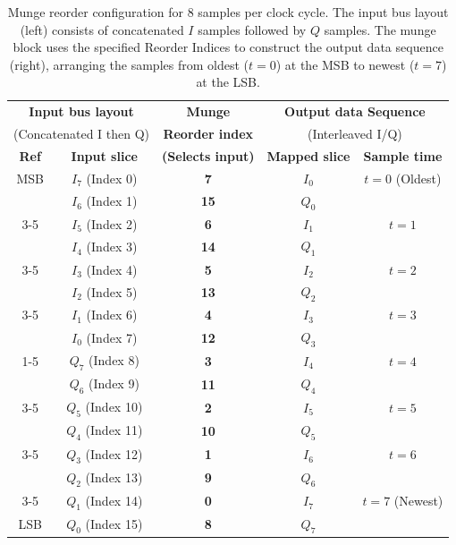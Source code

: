 \begin{table}[t]
\centering
\caption[Munge reorder configuration for 8 samples per clock]{Munge reorder configuration for 8 samples per clock cycle. The input bus layout (left) consists of concatenated $I$ samples followed by $Q$ samples. The munge block uses the specified Reorder Indices to construct the output data sequence (right), arranging the samples from oldest ($t=0$) at the MSB to newest ($t=7$) at the LSB.}
\label{tab:munge_reorder}
\renewcommand{\arraystretch}{1.2}
\setlength{\tabcolsep}{12pt}
\begin{tabular}{c c | c | c c}
\toprule
\multicolumn{2}{c|}{\textbf{Input bus layout}} & \textbf{Munge} & \multicolumn{2}{c}{\textbf{Output data Sequence}} \\
\multicolumn{2}{c|}{(Concatenated I then Q)} & \textbf{Reorder index} & \multicolumn{2}{c}{(Interleaved I/Q)} \\
\textbf{Ref} & \textbf{Input slice} & \textbf{(Selects input)} & \textbf{Mapped slice} & \textbf{Sample time} \\
\midrule
MSB & $I_7$ (Index 0) & \textbf{7} & $I_0$ & $t=0$ (Oldest) \\
& $I_6$ (Index 1) & \textbf{15} & $Q_0$ & \\
\cmidrule{3-5}
& $I_5$ (Index 2) & \textbf{6} & $I_1$ & $t=1$ \\
& $I_4$ (Index 3) & \textbf{14} & $Q_1$ & \\
\cmidrule{3-5}
& $I_3$ (Index 4) & \textbf{5} & $I_2$ & $t=2$ \\
& $I_2$ (Index 5) & \textbf{13} & $Q_2$ & \\
\cmidrule{3-5}
& $I_1$ (Index 6) & \textbf{4} & $I_3$ & $t=3$ \\
& $I_0$ (Index 7) & \textbf{12} & $Q_3$ & \\
\cmidrule{1-5}
& $Q_7$ (Index 8) & \textbf{3} & $I_4$ & $t=4$ \\
& $Q_6$ (Index 9) & \textbf{11} & $Q_4$ & \\
\cmidrule{3-5}
& $Q_5$ (Index 10) & \textbf{2} & $I_5$ & $t=5$ \\
& $Q_4$ (Index 11) & \textbf{10} & $Q_5$ & \\
\cmidrule{3-5}
& $Q_3$ (Index 12) & \textbf{1} & $I_6$ & $t=6$ \\
& $Q_2$ (Index 13) & \textbf{9} & $Q_6$ & \\
\cmidrule{3-5}
& $Q_1$ (Index 14) & \textbf{0} & $I_7$ & $t=7$ (Newest) \\
LSB & $Q_0$ (Index 15) & \textbf{8} & $Q_7$ & \\
\bottomrule
\end{tabular}
\end{table}


